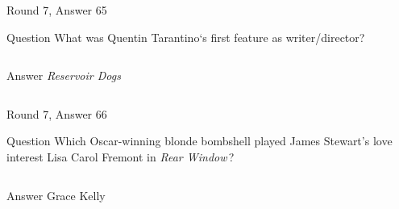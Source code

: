 \documentclass[11pt]{beamer}
\begin{document}
\begin{frame}[t]{Round 7, Answer 65}
\vspace{2em}
\begin{block}{Question}
What was Quentin Tarantino`s first feature as writer/director?
\end{block}
\pause{}
\begin{columns}[T,totalwidth=\linewidth]
\begin{column}{0.35\linewidth}
\begin{block}{Answer}
\emph{Reservoir Dogs}
\end{block}
\end{column}
\begin{column}{0.6\linewidth}
\begin{center}
\texttt{[image: \{Images/reservoir-dogs1]}.jpg}
\end{center}
\end{column}
\end{columns}
\end{frame}
    

\begin{frame}[t]{Round 7, Answer 66}
\vspace{2em}
\begin{block}{Question}
Which Oscar-winning blonde bombshell played James Stewart's love interest Lisa Carol Fremont in \emph{Rear Window}\,?
\end{block}
\pause{}
\begin{columns}[T,totalwidth=\linewidth]
\begin{column}{0.35\linewidth}
\begin{block}{Answer}
Grace Kelly
\end{block}
\end{column}
\begin{column}{0.6\linewidth}
\begin{center}
\texttt{[image: \{Images/rearwindow]}.jpg}
\end{center}
\end{column}
\end{columns}
\end{frame}
    
\end{document}
